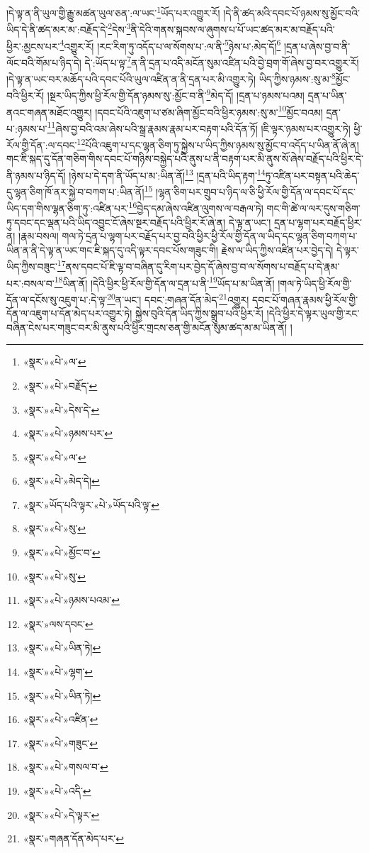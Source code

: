 །དེ་ལྟ་ན་ནི་ཡུལ་གྱི་རྒྱུ་མཚན་ཡུལ་ཅན་:ལ་ཡང་\footnote{«སྣར་»«པེ་»ལ་}ཡོད་པར་འགྱུར་རོ། །དེ་ནི་ཚད་མའི་དབང་པོ་ཉམས་སུ་མྱོང་བའི་ཡིད་དེ་ནི་ཚད་མར་མ་:བརྗོད་དེ་\footnote{«སྣར་»«པེ་»བརྗོད་}དེས་\footnote{«སྣར་»«པེ་»དེས་དེ་}ནི་དེའི་གནས་སྐབས་ལ་ཞུགས་པ་པོ་ཡང་ཚད་མར་མ་བརྗོད་པའི་ཕྱིར་:མྱངས་པར་\footnote{«སྣར་»«པེ་»ཉམས་པར་}འགྱུར་རོ། །རང་རིག་ཏུ་འདོད་པ་ལ་སོགས་པ་:ལ་ནི་\footnote{«སྣར་»«པེ་»ལ་}ཉེས་པ་:མེད་དོ།\footnote{«སྣར་»«པེ་»མེད་དེ།} །དྲན་པ་ཞེས་བྱ་བ་ནི་ལོང་བའི་གོམ་པ་ཉིད་དེ། དེ་:ཡོད་པ་ལྟ་\footnote{«སྣར་»ཡོད་པའི་ལྟར་«པེ་»ཡོད་པའི་ལྟ་}ན་ནི་དྲན་པ་འདི་མངོན་སུམ་འཛིན་པའི་བྱེ་བྲག་གོ་ཞེས་བྱ་བར་འགྱུར་རོ། །དེ་ལྟ་ན་ཡང་བར་མཆོད་པའི་དབང་པོའི་ཡུལ་འཛིན་ན་ནི་དྲན་པར་མི་འགྱུར་ཏེ། ཡིད་ཀྱིས་ཉམས་:སུ་མ་\footnote{«སྣར་»«པེ་»སུ་}མྱོང་བའི་ཕྱིར་རོ། །སྔར་ཡིད་ཀྱིས་ཕྱི་རོལ་གྱི་དོན་ཉམས་སུ་:མྱོང་བ་ནི་\footnote{«སྣར་»«པེ་»མྱོང་བ་}མེད་དོ། །དྲན་པ་ཉམས་པའམ། དྲན་པ་ཡིན་ནའང་གཞན་མཐོང་འགྱུར། །དབང་པོའི་འཇུག་པ་ཙམ་ཞིག་མྱོང་བའི་ཕྱིར་ཉམས་:སུ་མ་\footnote{«སྣར་»«པེ་»སུ་}མྱོང་བའམ། དྲན་པ་:ཉམས་པ་\footnote{«སྣར་»«པེ་»ཉམས་པའམ་}ཞེས་བྱ་བའི་འམ་ཞེས་པའི་སྒྲ་རྣམས་རྣམ་པར་བརྟག་པའི་དོན་ཏོ། །ཇི་ལྟར་ཉམས་པར་འགྱུར་ཏེ། ཕྱི་རོལ་གྱི་དོན་:ལ་དབང་\footnote{«སྣར་»ལས་དབང་}པོའི་འཇུག་པ་དང་ལྷན་ཅིག་ཏུ་སྐྱེས་པ་ཡིད་ཀྱིས་ཉམས་སུ་མྱོང་བ་འདོད་པ་ཡིན་ནོ་ཞེ་ན། གང་ཇི་སྐད་དུ་དོན་གཅིག་གིས་དབང་པོ་གཉིས་བསྐྱེད་པའི་ནུས་པ་ནི་བརྟག་པར་མི་ནུས་སོ་ཞེས་བརྗོད་པའི་ཕྱིར་དེ་ནི་ཉམས་པ་ཉིད་དོ། །ཉེས་པ་དེ་དག་ནི་ཡོད་པ་མ་:ཡིན་ནོ།\footnote{«སྣར་»«པེ་»ཡིན་ཏེ།} །དྲན་པའི་ཡིད་རྟག་\footnote{«སྣར་»«པེ་»ལྷག་}ཏུ་འཛིན་པར་བསྟན་པའི་ཆེད་དུ་ལྷན་ཅིག་ཁོ་ནར་སྐྱེ་བ་བཀག་པ་:ཡིན་ནོ།\footnote{«སྣར་»«པེ་»ཡིན་ཏེ།} །ལྷན་ཅིག་པར་གྲུབ་པ་ཉིད་ལ་ཅི་ཕྱི་རོལ་གྱི་དོན་ལ་དབང་པོ་དང་ཡིད་དག་གིས་ལྷན་ཅིག་ཏུ་:འཛིན་པར་\footnote{«སྣར་»«པེ་»འཛིན་}བྱེད་དམ་ཞེས་འཛིན་ལུགས་ལ་བརྒལ་ཏེ། གང་གི་ཚེ་ལ་ལར་དུས་གཅིག་ཏུ་དབང་དང་ལྡན་པའི་ཡིད་འབྱུང་ངོ་ཞེས་སྔར་བརྗོད་པའི་ཕྱིར་རོ་ཞེ་ན། དེ་ལྟ་ན་ཡང་། དྲན་པ་ལྷག་པར་བརྗོད་ཕྱིར་ན། །རྣམ་བསལ། གལ་ཏེ་དྲན་པ་ལྷག་པར་བརྗོད་པར་བྱ་བའི་ཕྱིར་ཕྱི་རོལ་གྱི་དོན་ལ་ཡིད་དང་ལྷན་ཅིག་བཀག་པ་ཡིན་ན་ནི་དེ་ལྟ་ན་ཡང་གང་ཇི་སྐད་དུ་འདི་ལྟར་དབང་པོས་གཟུང་གི། རྗེས་ལ་ཡིད་ཀྱིས་འཛིན་པར་བྱེད་དེ། དེ་ལྟར་ཡིད་ཀྱིས་བཟུང་\footnote{«སྣར་»«པེ་»གཟུང་}ནས་དབང་པོ་ཇི་ལྟ་བ་བཞིན་དུ་རིག་པར་བྱེད་དོ་ཞེས་བྱ་བ་ལ་སོགས་པ་བརྗོད་པ་དེ་རྣམ་པར་:བསལ་བ་\footnote{«སྣར་»«པེ་»གསལ་བ་}ཡིན་ནོ། །དེའི་ཕྱིར་ཕྱི་རོལ་གྱི་དོན་ལ་དྲན་པ་ནི་\footnote{«སྣར་»«པེ་»འདི་}ཡོད་པ་མ་ཡིན་ནོ། །གལ་ཏེ་ཡིད་ཕྱི་རོལ་གྱི་དོན་ལ་དངོས་སུ་འཇུག་པ་:དེ་ལྟ་\footnote{«སྣར་»«པེ་»དེ་ལྟར་}ན་ཡང་། དབང་:གཞན་དོན་མེད་\footnote{«སྣར་»གཞན་དོན་མེད་པར་}འགྱུར། དབང་པོ་གཞན་རྣམས་ཕྱི་རོལ་གྱི་དོན་ལ་འཇུག་པ་དོན་མེད་པར་འགྱུར་ཏེ། སྐྱེས་བུའི་དོན་ཡིད་ཀྱིས་སྒྲུབ་པའི་ཕྱིར་རོ། །དེའི་ཕྱིར་དེ་ལྟར་ཡུལ་གྱི་རང་བཞིན་ངེས་པར་གཟུང་བར་མི་ནུས་པའི་ཕྱིར་གྲངས་ཅན་གྱི་མངོན་སུམ་ཚད་མ་མ་ཡིན་ནོ། །
